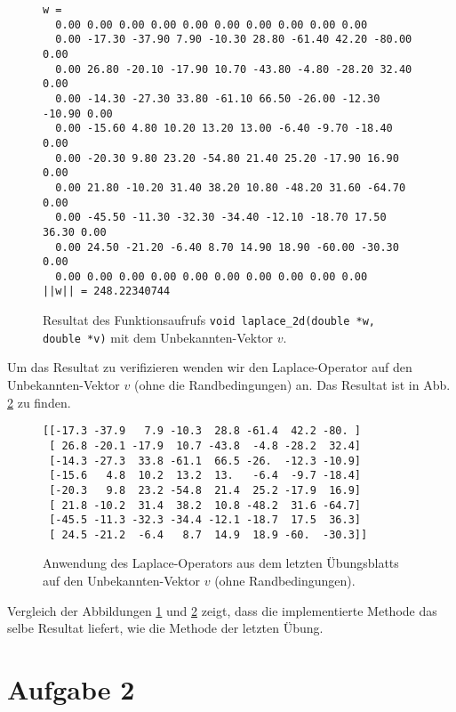 \documentclass[10pt,a4paper]{article}
\begin{document}
\begin{figure}[H]
  \centering
\begin{verbatim}
w = 
  0.00 0.00 0.00 0.00 0.00 0.00 0.00 0.00 0.00 0.00 
  0.00 -17.30 -37.90 7.90 -10.30 28.80 -61.40 42.20 -80.00 0.00 
  0.00 26.80 -20.10 -17.90 10.70 -43.80 -4.80 -28.20 32.40 0.00 
  0.00 -14.30 -27.30 33.80 -61.10 66.50 -26.00 -12.30 -10.90 0.00 
  0.00 -15.60 4.80 10.20 13.20 13.00 -6.40 -9.70 -18.40 0.00 
  0.00 -20.30 9.80 23.20 -54.80 21.40 25.20 -17.90 16.90 0.00 
  0.00 21.80 -10.20 31.40 38.20 10.80 -48.20 31.60 -64.70 0.00 
  0.00 -45.50 -11.30 -32.30 -34.40 -12.10 -18.70 17.50 36.30 0.00 
  0.00 24.50 -21.20 -6.40 8.70 14.90 18.90 -60.00 -30.30 0.00 
  0.00 0.00 0.00 0.00 0.00 0.00 0.00 0.00 0.00 0.00 
||w|| = 248.22340744
\end{verbatim}
  \caption{Resultat des Funktionsaufrufs \texttt{void laplace\_2d(double *w,
  double *v)} mit dem Unbekannten-Vektor $v$.}
  \label{fig:w}
\end{figure}

Um das Resultat zu verifizieren wenden wir den Laplace-Operator auf den
Unbekannten-Vektor $v$ (ohne die Randbedingungen) an. Das Resultat ist in Abb.
\ref{fig:verify} zu finden.

\begin{figure}[H]
  \centering
\begin{verbatim}
[[-17.3 -37.9   7.9 -10.3  28.8 -61.4  42.2 -80. ]
 [ 26.8 -20.1 -17.9  10.7 -43.8  -4.8 -28.2  32.4]
 [-14.3 -27.3  33.8 -61.1  66.5 -26.  -12.3 -10.9]
 [-15.6   4.8  10.2  13.2  13.   -6.4  -9.7 -18.4]
 [-20.3   9.8  23.2 -54.8  21.4  25.2 -17.9  16.9]
 [ 21.8 -10.2  31.4  38.2  10.8 -48.2  31.6 -64.7]
 [-45.5 -11.3 -32.3 -34.4 -12.1 -18.7  17.5  36.3]
 [ 24.5 -21.2  -6.4   8.7  14.9  18.9 -60.  -30.3]]
\end{verbatim}
  \caption{Anwendung des Laplace-Operators aus dem letzten Übungsblatts auf den
    Unbekannten-Vektor $v$ (ohne Randbedingungen).}
  \label{fig:verify}
\end{figure}

Vergleich der Abbildungen \ref{fig:w} und \ref{fig:verify} zeigt, dass die
implementierte Methode das selbe Resultat liefert, wie die Methode der letzten
Übung.
\section{Aufgabe 2}
\end{document}
